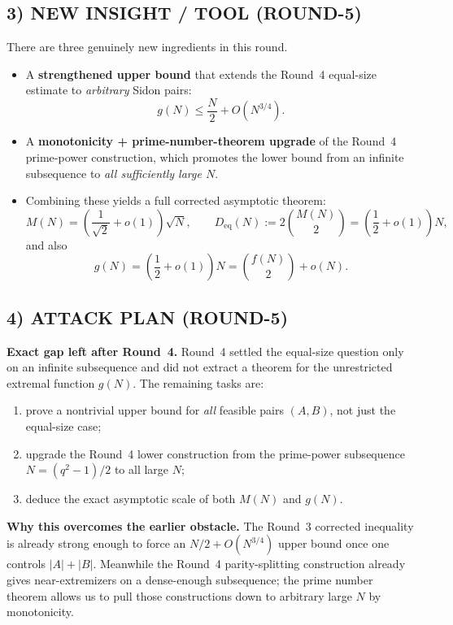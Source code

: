 \subsection{3) NEW INSIGHT / TOOL (ROUND-5)}

There are three genuinely new ingredients in this round.
\begin{itemize}
\item A \textbf{strengthened upper bound} that extends the Round~4 equal-size estimate to \emph{arbitrary} Sidon pairs:
\[
g(N)\le \frac N2+O(N^{3/4}).
\]
\item A \textbf{monotonicity + prime-number-theorem upgrade} of the Round~4 prime-power construction, which promotes the lower bound from an infinite subsequence to \emph{all sufficiently large $N$}.
\item Combining these yields a full corrected asymptotic theorem:
\[
M(N)=\left(\frac1{\sqrt2}+o(1)\right)\sqrt N,
\qquad
D_{\mathrm{eq}}(N):=2\binom{M(N)}2=\left(\frac12+o(1)\right)N,
\]
and also
\[
g(N)=\left(\frac12+o(1)\right)N=\binom{f(N)}2+o(N).
\]
\end{itemize}

\subsection{4) ATTACK PLAN (ROUND-5)}

\textbf{Exact gap left after Round~4.}
Round~4 settled the equal-size question only on an infinite subsequence and did not extract a theorem for the unrestricted extremal function $g(N)$.  The remaining tasks are:
\begin{enumerate}
\item prove a nontrivial upper bound for \emph{all} feasible pairs $(A,B)$, not just the equal-size case;
\item upgrade the Round~4 lower construction from the prime-power subsequence $N=(q^2-1)/2$ to all large $N$;
\item deduce the exact asymptotic scale of both $M(N)$ and $g(N)$.
\end{enumerate}

\textbf{Why this overcomes the earlier obstacle.}
The Round~3 corrected inequality is already strong enough to force an $N/2+O(N^{3/4})$ upper bound once one controls $|A|+|B|$.  Meanwhile the Round~4 parity-splitting construction already gives near-extremizers on a dense-enough subsequence; the prime number theorem allows us to pull those constructions down to arbitrary large $N$ by monotonicity.


